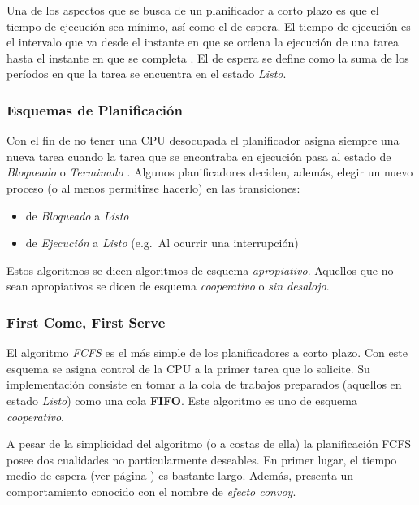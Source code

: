 Una de los aspectos que se busca de un planificador a corto plazo es que el tiempo de ejecución sea mínimo, así como el de espera.
El tiempo de ejecución es el intervalo que va desde el instante en que se ordena la ejecución de una tarea hasta el instante en que se completa \cite{silberschatz}.
El de espera\label{tiempo-espera} se define como la suma de los períodos en que la tarea se encuentra en el estado \emph{Listo}.

\subsubsection{Esquemas de Planificación}

Con el fin de no tener una CPU desocupada el planificador asigna siempre una nueva tarea cuando la tarea que se encontraba en ejecución pasa al estado de \emph{Bloqueado} o \emph{Terminado} \cite{catedra-planificacion}.
Algunos planificadores deciden, además, elegir un nuevo proceso (o al menos permitirse hacerlo) en las transiciones:
\begin{itemize}
	\item de \emph{Bloqueado} a \emph{Listo}
	\item de \emph{Ejecución} a \emph{Listo} (e.g.\ Al ocurrir una interrupción)
\end{itemize}

Estos algoritmos se dicen algoritmos de esquema \emph{apropiativo}.
Aquellos que no sean apropiativos se dicen de esquema \emph{cooperativo} o \emph{sin desalojo}.


\subsubsection{First Come, First Serve}\label{fcfs}

El algoritmo \emph{FCFS} es el más simple de los planificadores a corto plazo.
Con este esquema se asigna control de la CPU a la primer tarea que lo solicite.
Su implementación consiste en tomar a la cola de trabajos preparados (aquellos en estado \emph{Listo}) como una cola \textbf{FIFO}.
Este algoritmo es uno de esquema \emph{cooperativo}.

A pesar de la simplicidad del algoritmo (o a costas de ella) la planificación FCFS posee dos cualidades no particularmente deseables.
En primer lugar, el tiempo medio de espera (ver página \pageref{tiempo-espera}) es bastante largo\cite{silberschatz}.
Además, presenta un comportamiento conocido con el nombre de \emph{efecto convoy}.

